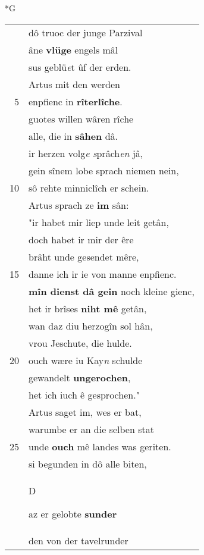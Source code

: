 \documentclass[8pt,a4paper,notitlepage]{article}
\begin{document}
\begin{table}[ht]
\begin{minipage}[t]{0.5\linewidth}
\small
\begin{center}*G
\end{center}
\begin{tabular}{rl}
 & dô truoc der junge Parzival\\ 
 & âne \textbf{vlüge} engels mâl\\ 
 & sus geblü\textit{e}t ûf der erden.\\ 
 & Artus mit den werden\\ 
5 & enpfienc in \textbf{rîterlîche}.\\ 
 & guotes willen wâren rîche\\ 
 & alle, die in \textbf{sâhen} dâ.\\ 
 & ir herzen volg\textit{e} \textit{s}prâch\textit{en} jâ,\\ 
 & gein sînem lobe sprach niemen nein,\\ 
10 & sô rehte minniclîch er schein.\\ 
 & Artus sprach ze \textbf{im} sân:\\ 
 & "ir habet mir liep unde leit getân,\\ 
 & doch habet ir mir der êre\\ 
 & brâht unde gesendet mêre,\\ 
15 & danne ich ir ie von manne enpfienc.\\ 
 & \textbf{mîn dienst dâ gein} noch kleine gienc,\\ 
 & het ir brîses \textbf{niht mê} getân,\\ 
 & wan daz diu herzogîn sol hân,\\ 
 & vrou Jeschute, die hulde.\\ 
20 & ouch wære iu Kay\textit{n} schulde\\ 
 & gewandelt \textbf{ungerochen},\\ 
 & het ich iuch ê gesprochen."\\ 
 & Artus saget im, wes er bat,\\ 
 & warumbe er an die selben stat\\ 
25 & unde \textbf{ouch} mê landes was geriten.\\ 
 & si begunden in dô alle biten,\\ 
 & \begin{large}D\end{large}az er gelobte \textbf{sunder}\\ 
 & den von der tavelrunder\\ 

\end{tabular}
\end{minipage}
\end{table}
\end{document}
